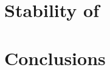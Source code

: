 \documentclass[aps,pre,preprint,groupedaddress]{revtex4}
\begin{document}
\section{Stability of \reqva}
    

\section{Conclusions}
    




\end{document}
